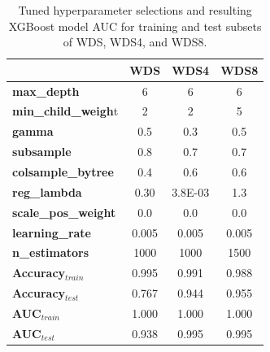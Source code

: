 \begin{table}%
    \centering
    \begin{tabular}{l|c|c|c|}
    \cline{2-4}
                                             & \textbf{WDS}   & \textbf{WDS4}    & \textbf{WDS8}  \\ \hline
    \multicolumn{1}{|l|}{\textbf{max\_depth}}         & 6     & 6       & 6     \\ \hline
    \multicolumn{1}{|l|}{\textbf{min\_child\_weigh}t} & 2     & 2       & 5     \\ \hline
    \multicolumn{1}{|l|}{\textbf{gamma}}              & 0.5   & 0.3     & 0.5   \\ \hline
    \multicolumn{1}{|l|}{\textbf{subsample}}          & 0.8   & 0.7     & 0.7   \\ \hline
    \multicolumn{1}{|l|}{\textbf{colsample\_bytree}}  & 0.4   & 0.6     & 0.6   \\ \hline
    \multicolumn{1}{|l|}{\textbf{reg\_lambda}}        & 0.30  & 3.8E-03 & 1.3   \\ \hline
    \multicolumn{1}{|l|}{\textbf{scale\_pos\_weight}} & 0.0   & 0.0     & 0.0   \\ \hline
    \multicolumn{1}{|l|}{\textbf{learning\_rate}}     & 0.005 & 0.005   & 0.005 \\ \hline
    \multicolumn{1}{|l|}{\textbf{n\_estimators}}      & 1000  & 1000    & 1500  \\ \hline
    \multicolumn{1}{|l|}{\textbf{Accuracy$_{train}$}} & 0.995 & 0.991   & 0.988 \\ \hline
    \multicolumn{1}{|l|}{\textbf{Accuracy$_{test}$}}  & 0.767 & 0.944   & 0.955 \\ \hline
    \multicolumn{1}{|l|}{\textbf{AUC$_{train}$}}      & 1.000 & 1.000   & 1.000 \\ \hline
    \multicolumn{1}{|l|}{\textbf{AUC$_{test}$}}       & 0.938 & 0.995   & 0.995 \\ \hline
    \end{tabular}
    \caption[XGBoost hyperparameter tuning results]{Tuned hyperparameter selections and resulting XGBoost model AUC for training and test subsets of WDS, WDS4, and WDS8.}
    \label{tab:xgb_tuning}
\end{table}

